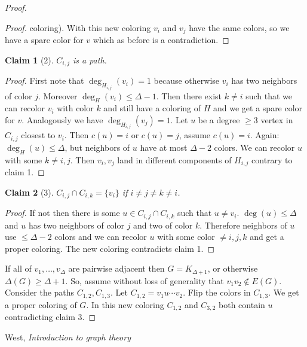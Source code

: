 \documentclass[a4paper]{article}
\theoremstyle{plain}
\newtheorem*{claim}{Claim}
\theoremstyle{myremark}
\begin{document}
\begin{proof}
\begin{proof}
coloring). With this new coloring $v_i$ and $v_j$ have the same colors,
so we have a spare color for $v$ which as before is a contradiction.
\end{proof}
\begin{claim}[2]
$C_{i,j}$ is a path.
\end{claim}
\begin{proof}
First note that $\deg_{H_{i,j}}(v_i) = 1$ because otherwise $v_i$ has
two neighbors of color $j$. Moreover $\deg_H(v_i) \le \Delta - 1$. Then
there exist $k \neq i$ such that we can recolor $v_i$ with color $k$ and
still have a coloring of $H$ and we get a spare color for $v$.
Analogously we have $\deg_{H_{i,j}}(v_j) = 1$. Let $u$ be a degree $\ge
3$ vertex in $C_{i,j}$ closest to $v_i$. Then $c(u) = i$ or $c(u) = j$,
assume $c(u) = i$. Again: $\deg_H(u) \le \Delta$, but neighbors of $u$
have at most $\Delta - 2$ colors. We can recolor $u$ with some $k
\neq i,j$. Then $v_i,v_j$ land in different components of $H_{i,j}$
contrary to claim 1. 
\end{proof}
\begin{claim}[3]
$C_{i,j} \cap C_{i,k} = \{v_i\}$ if $i \neq j \neq k \neq i$.
\end{claim}
\begin{proof}
If not then there is some $u \in C_{i,j} \cap C_{i,k}$ such that $u \neq
v_i$. $\deg(u) \le \Delta$ and $u$ has two neighbors of color $j$ and
two of color $k$. Therefore neighbors of $u$ use $\le \Delta - 2$ colors
and we can recolor $u$ with some color $\neq i,j,k$ and get a proper
coloring. The new coloring contradicts claim 1.
\end{proof}
If all of $v_1,\ldots,v_{\Delta}$ are pairwise adjacent then $G =
K_{\Delta + 1}$, or otherwise $\Delta(G) \ge \Delta + 1$.  So, assume without
loss of generality that $v_1v_2 \notin E(G)$. Consider the paths
$C_{1,2},C_{1,3}$. Let $C_{1,2} = v_1u\cdots v_2$. Flip the colors in
$C_{1,3}$. We get a proper coloring of $G$. In this new coloring
$C_{1,2}$ and $C_{3,2}$ both contain $u$ contradicting claim 3.
\end{proof}


\begin{thebibliography}{9}
 West, \textit{Introduction to graph theory}

\end{thebibliography}
\end{document}
